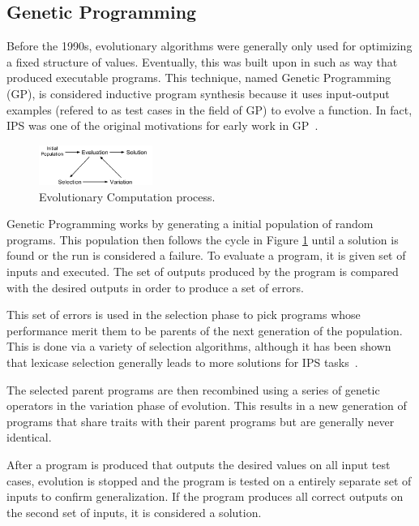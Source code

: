 \subsection{Genetic Programming}

Before the 1990s, evolutionary algorithms were generally only used for optimizing a fixed structure of values. Eventually, this was built upon in such as way that produced executable programs. This technique, named Genetic Programming (GP), is considered inductive program synthesis because it uses input-output examples (refered to as test cases in the field of GP) to evolve a function. In fact, IPS was one of the original motivations for early work in GP~\cite{Koza1992}.

\begin{figure}[t]
\centering
\includegraphics[width=0.33\textwidth]{res/EvolutionCycle}
\caption{Evolutionary Computation process.}
\label{fig:evo}
\end{figure}

Genetic Programming works by generating a initial population of random programs.  This population then follows the cycle in Figure \ref{fig:evo} until a solution is found or the run is considered a failure. To evaluate a program, it is given set of inputs and executed. The set of outputs produced by the program is compared with the desired outputs in order to produce a set of errors. 

This set of errors is used in the selection phase to pick programs whose performance merit them to be parents of the next generation of the population. This is done via a variety of selection algorithms, although it has been shown that lexicase selection generally leads to more solutions for IPS tasks~\cite{Helmuth2015a, Helmuth2015c, Forstenlechner:2017:eurogp}.

The selected parent programs are then recombined using a series of genetic operators in the variation phase of evolution. This results in a new generation of programs that share traits with their parent programs but are generally never identical.

After a program is produced that outputs the desired values on all input test cases, evolution is stopped and the program is tested on a entirely separate set of inputs to confirm generalization. If the program produces all correct outputs on the second set of inputs, it is considered a solution.

